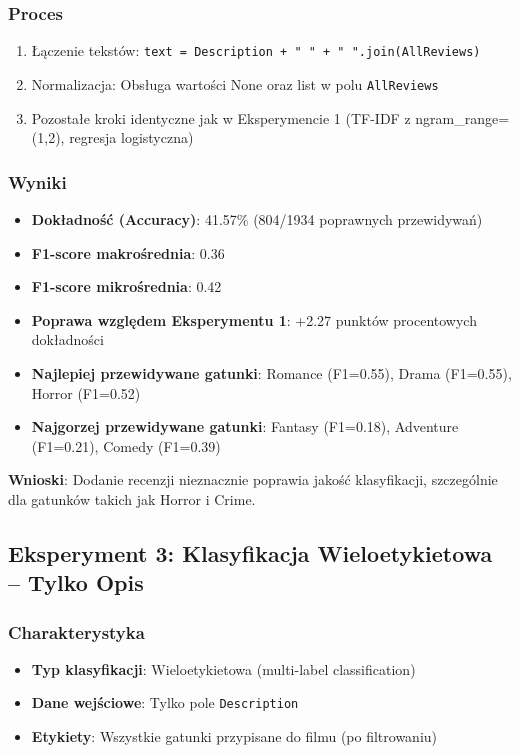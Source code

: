 \documentclass[12pt,a4paper]{article}
\begin{document}
\subsubsection{Proces}
\begin{enumerate}
    \item Łączenie tekstów: \texttt{text = Description + " " + " ".join(AllReviews)}
    \item Normalizacja: Obsługa wartości None oraz list w polu \texttt{AllReviews}
    \item Pozostałe kroki identyczne jak w Eksperymencie 1 (TF-IDF z ngram\_range=(1,2), regresja logistyczna)
\end{enumerate}

\subsubsection{Wyniki}
\begin{itemize}
    \item \textbf{Dokładność (Accuracy)}: 41.57\% (804/1934 poprawnych przewidywań)
    \item \textbf{F1-score makrośrednia}: 0.36
    \item \textbf{F1-score mikrośrednia}: 0.42
    \item \textbf{Poprawa względem Eksperymentu 1}: +2.27 punktów procentowych dokładności
    \item \textbf{Najlepiej przewidywane gatunki}: Romance (F1=0.55), Drama (F1=0.55), Horror (F1=0.52)
    \item \textbf{Najgorzej przewidywane gatunki}: Fantasy (F1=0.18), Adventure (F1=0.21), Comedy (F1=0.39)
\end{itemize}

\textbf{Wnioski}: Dodanie recenzji nieznacznie poprawia jakość klasyfikacji, szczególnie dla gatunków takich jak Horror i Crime.

\subsection{Eksperyment 3: Klasyfikacja Wieloetykietowa -- Tylko Opis}

\subsubsection{Charakterystyka}
\begin{itemize}
    \item \textbf{Typ klasyfikacji}: Wieloetykietowa (multi-label classification)
    \item \textbf{Dane wejściowe}: Tylko pole \texttt{Description}
    \item \textbf{Etykiety}: Wszystkie gatunki przypisane do filmu (po filtrowaniu)
\end{itemize}
\end{document}
